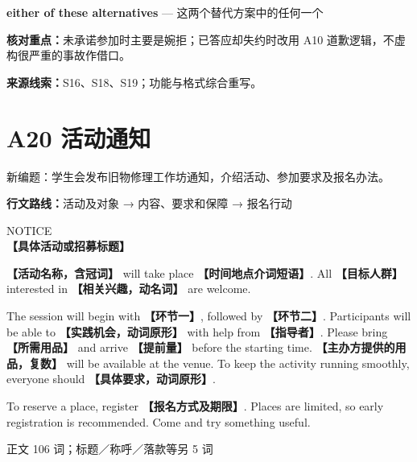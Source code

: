 \documentclass[11pt,a4paper,fontset=macnew]{ctexart}
\newenvironment{writing}{\begingroup\fontsize{10.5}{13.5}\selectfont\setlength{\parskip}{3pt}}{\par\endgroup}
\begin{document}
{\small\textbf{either of these alternatives} — 这两个替代方案中的任何一个}\par
{\small\textbf{核对重点：}未承诺参加时主要是婉拒；已答应却失约时改用 A10 道歉逻辑，不虚构很严重的事故作借口。}\par
{\fontsize{8}{10}\selectfont\textbf{来源线索：}S16、S18、S19；功能与格式综合重写。}\par
\clearpage\section*{A20  活动通知}
{\small 新编题：学生会发布旧物修理工作坊通知，介绍活动、参加要求及报名办法。}\par
{\small\textbf{行文路线：}活动及对象 → 内容、要求和保障 → 报名行动}\par
\par\vspace{4pt}{\bfseries 可替换模板}\par\nopagebreak
\begin{writing}
{\centering NOTICE\\{\bfseries 【具体活动或招募标题】}\par}
{\bfseries 【活动名称，含冠词】} will take place {\bfseries 【时间地点介词短语】}. All {\bfseries 【目标人群】} interested in {\bfseries 【相关兴趣，动名词】} are welcome.

The session will begin with {\bfseries 【环节一】}, followed by {\bfseries 【环节二】}. Participants will be able to {\bfseries 【实践机会，动词原形】} with help from {\bfseries 【指导者】}. Please bring {\bfseries 【所需用品】} and arrive {\bfseries 【提前量】} before the starting time. {\bfseries 【主办方提供的用品，复数】} will be available at the venue. To keep the activity running smoothly, everyone should {\bfseries 【具体要求，动词原形】}.

To reserve a place, register {\bfseries 【报名方式及期限】}. Places are limited, so early registration is recommended. Come and try something useful.

\par
\end{writing}
\par\vspace{4pt}{\bfseries 完整套用示例}\par\nopagebreak
{\small 正文 106 词；标题／称呼／落款等另 5 词}\par
\end{document}
